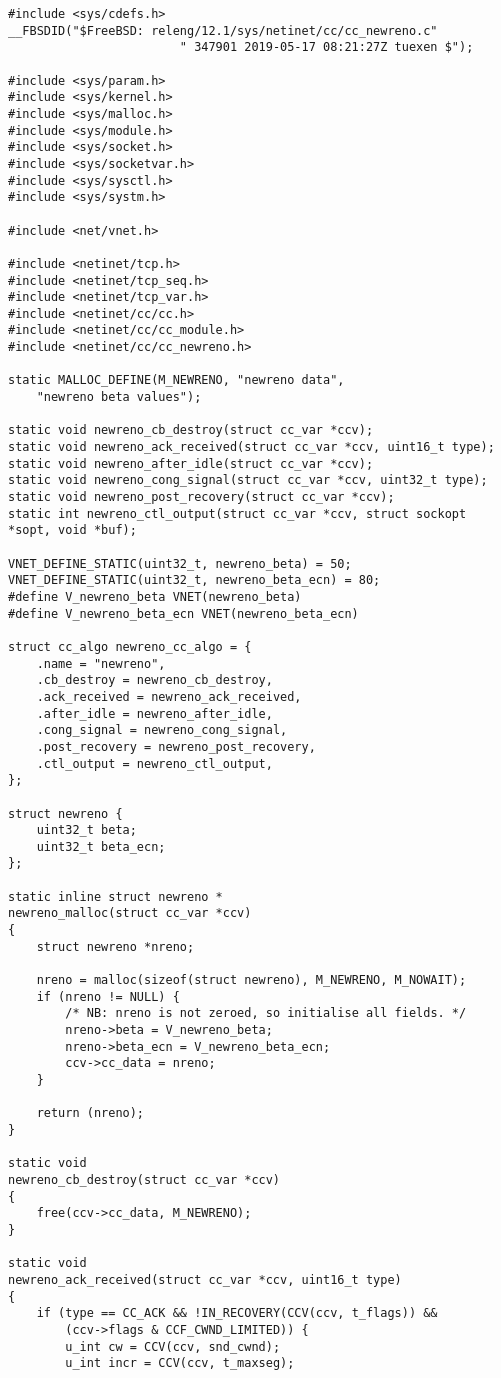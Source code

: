 \begin{code}
\begin{verbatim}
#include <sys/cdefs.h>
__FBSDID("$FreeBSD: releng/12.1/sys/netinet/cc/cc_newreno.c"
                        " 347901 2019-05-17 08:21:27Z tuexen $");

#include <sys/param.h>
#include <sys/kernel.h>
#include <sys/malloc.h>
#include <sys/module.h>
#include <sys/socket.h>
#include <sys/socketvar.h>
#include <sys/sysctl.h>
#include <sys/systm.h>

#include <net/vnet.h>

#include <netinet/tcp.h>
#include <netinet/tcp_seq.h>
#include <netinet/tcp_var.h>
#include <netinet/cc/cc.h>
#include <netinet/cc/cc_module.h>
#include <netinet/cc/cc_newreno.h>

static MALLOC_DEFINE(M_NEWRENO, "newreno data",
    "newreno beta values");

static void	newreno_cb_destroy(struct cc_var *ccv);
static void	newreno_ack_received(struct cc_var *ccv, uint16_t type);
static void	newreno_after_idle(struct cc_var *ccv);
static void	newreno_cong_signal(struct cc_var *ccv, uint32_t type);
static void	newreno_post_recovery(struct cc_var *ccv);
static int newreno_ctl_output(struct cc_var *ccv, struct sockopt *sopt, void *buf);

VNET_DEFINE_STATIC(uint32_t, newreno_beta) = 50;
VNET_DEFINE_STATIC(uint32_t, newreno_beta_ecn) = 80;
#define V_newreno_beta VNET(newreno_beta)
#define V_newreno_beta_ecn VNET(newreno_beta_ecn)

struct cc_algo newreno_cc_algo = {
    .name = "newreno",
    .cb_destroy = newreno_cb_destroy,
    .ack_received = newreno_ack_received,
    .after_idle = newreno_after_idle,
    .cong_signal = newreno_cong_signal,
    .post_recovery = newreno_post_recovery,
    .ctl_output = newreno_ctl_output,
};

struct newreno {
    uint32_t beta;
    uint32_t beta_ecn;
};

static inline struct newreno *
newreno_malloc(struct cc_var *ccv)
{
    struct newreno *nreno;

    nreno = malloc(sizeof(struct newreno), M_NEWRENO, M_NOWAIT);
    if (nreno != NULL) {
        /* NB: nreno is not zeroed, so initialise all fields. */
        nreno->beta = V_newreno_beta;
        nreno->beta_ecn = V_newreno_beta_ecn;
        ccv->cc_data = nreno;
    }

    return (nreno);
}

static void
newreno_cb_destroy(struct cc_var *ccv)
{
    free(ccv->cc_data, M_NEWRENO);
}

static void
newreno_ack_received(struct cc_var *ccv, uint16_t type)
{
    if (type == CC_ACK && !IN_RECOVERY(CCV(ccv, t_flags)) &&
        (ccv->flags & CCF_CWND_LIMITED)) {
        u_int cw = CCV(ccv, snd_cwnd);
        u_int incr = CCV(ccv, t_maxseg);


\end{verbatim}
\end{code}
